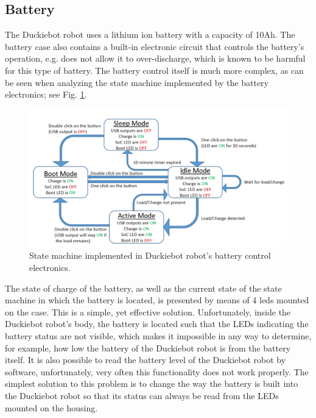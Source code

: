\documentclass[conference]{IEEEtran}
\begin{document}


\subsection{Battery}
The Duckiebot robot uses a lithium ion battery with a capacity of 10Ah. The battery case also contains a built-in electronic circuit that controls the battery's operation, e.g. does not allow it to over-discharge, which is known to be harmful for this type of battery. The battery control itself is much more complex, as can be seen when analyzing the state machine implemented by the battery electronics; see Fig. \ref{fig:battery-state-machine}.

\begin{figure}[ht!]
    \centering
    \includegraphics[width=1.0\columnwidth]{BatteryStateMachine.png}
    \caption{State machine implemented in Duckiebot robot's battery control electronics.}
    \label{fig:battery-state-machine}
\end{figure}

The state of charge of the battery, as well as the current state of the state machine in which the battery is located, is presented by means of 4 leds mounted on the case. This is a simple, yet effective solution. Unfortunately, inside the Duckiebot robot's body, the battery is located such that the LEDs indicating the battery status are not visible, which makes it impossible in any way to determine, for example, how low the battery of the Duckiebot robot is from the battery itself. It is also possible to read the battery level of the Duckiebot robot by software, unfortunately, very often this functionality does not work properly. The simplest solution to this problem is to change the way the battery is built into the Duckiebot robot so that its status can always be read from the LEDs mounted on the housing.
\end{document}
